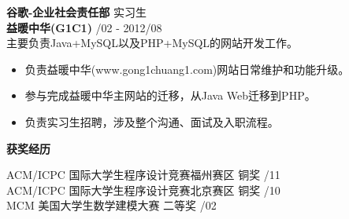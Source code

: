 \documentclass[a4paper]{article}
\newenvironment{changemargin}[2]{%
  \begin{list}{}{%
    \setlength{\topsep}{0pt}%
    \setlength{\leftmargin}{#1}%
    \setlength{\rightmargin}{#2}%
    \setlength{\listparindent}{\parindent}%
    \setlength{\itemindent}{\parindent}%
    \setlength{\parsep}{\parskip}%
  }%
  \item[]}{\end{list}
}
\newcommand{\lineover}{
	\begin{changemargin}{-0.05in}{-0.05in}
		\vspace*{-8pt}
		\hrulefill \\
		\vspace*{-2pt}
	\end{changemargin}
}
\newcommand{\header}[1]{
	\begin{changemargin}{-0.5in}{-0.5in}
	\fontsize{12}{14} \scshape{\textbf{#1}}\\
	\end{changemargin}
}
\newenvironment{body} {
	\vspace*{-16pt}
	\begin{changemargin}{-0.5in}{-0.5in}
  }	
	{\end{changemargin}
}
\begin{document}
\begin{body}
	\vspace{10pt}
	\textbf{谷歌-企业社会责任部} \hfill 实习生\\ 
	\textbf{益暖中华{\fontarial (G1C1)}} \hfill {/02 - 2012/08}\\ 
	主要负责{\fontarial Java+MySQL}以及{\fontarial PHP+MySQL}的网站开发工作。\\ 
	\vspace*{-6pt}
	\begin{itemize} \itemsep -0pt  %
		\item 负责益暖中华{\fontarial(www.gong1chuang1.com)}网站日常维护和功能升级。\\
	\end{itemize}
	\vspace*{-12pt}
	\begin{itemize} \itemsep -0pt  %
		\item 参与完成益暖中华主网站的迁移，从{\fontarial Java Web}迁移到{\fontarial PHP}。\\
	\end{itemize}
	\vspace*{-12pt}
	\begin{itemize} \itemsep -0pt  %
		\item 负责实习生招聘，涉及整个沟通、面试及入职流程。\\
	\end{itemize}
\end{body}

\medskip


\header{获奖经历}
\begin{body}
	\vspace{14pt}
	{{\fontarial ACM/ICPC} 国际大学生程序设计竞赛福州赛区 铜奖} \hfill {/11}\\
	{{\fontarial ACM/ICPC} 国际大学生程序设计竞赛北京赛区 铜奖} \hfill {/10}\\
	{{\fontarial MCM} 美国大学生数学建模大赛 二等奖} \hfill {/02}\\
\end{body}

\medskip


\end{document}
